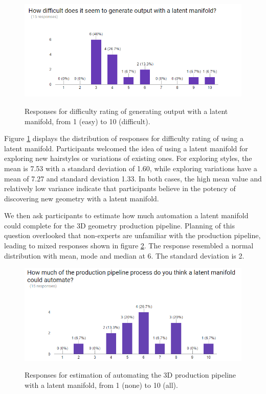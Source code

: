 \documentclass[ %
author={Dillon Keith Diep},
supervisor={Dr. Carl Henrik Ek},
degree={MEng},
title={ART-CG Hair:},
subtitle={Assisted Real-time Content Generation of Stylised Virtual Hair},
type={Research},
year={2017} ]{dissertation}
\begin{document}
	\begin{figure}[!h]
		\centering
		\caption{Responses for difficulty rating of generating output with a latent manifold, from 1 (easy) to 10 (difficult).}
		\includegraphics[scale=0.7]{images/surveyDifficulty}
		\label{fig:surveyDifficulty}
	\end{figure}
	
	Figure \ref{fig:surveyDifficulty} displays the distribution of responses for difficulty rating of using a latent manifold.
	Participants welcomed the idea of using a latent manifold for exploring new hairstyles or variations of existing ones. For exploring styles, the mean is 7.53 with a standard deviation of 1.60, while exploring variations have a mean of 7.27 and standard deviation 1.33. In both cases, the high mean value and relatively low variance indicate that participants believe in the potency of discovering new geometry with a latent manifold.
	
	We then ask participants to estimate how much automation a latent manifold could complete for the 3D geometry production pipeline. Planning of this question overlooked that non-experts are unfamiliar with the production pipeline, leading to mixed responses shown in figure \ref{surveyAutomate}. The response resembled a normal distribution with mean, mode and median at 6. The standard deviation is 2.
	\begin{figure}[!h]
		\centering
		\caption{Responses for estimation of automating the 3D production pipeline with a latent manifold, from 1 (none) to 10 (all).}
		\includegraphics[scale=0.7]{images/surveyAutomate}
		\label{surveyAutomate}
	\end{figure}
	
\end{document}
